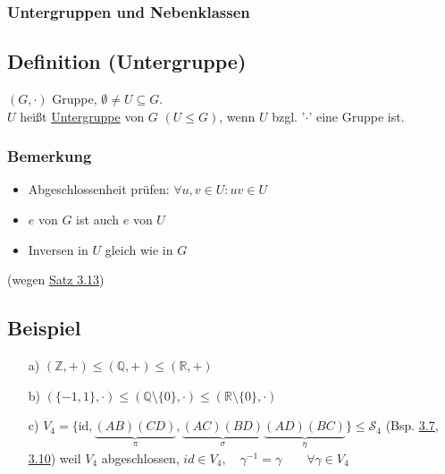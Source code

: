 \documentclass[12pt,titlepage, pdf]{article}
\newcommand{\R}{\mathds{R}}
\newcommand{\uline}[1]{\underline{#1}}
\newcommand{\id}{\textrm{id}}
\renewcommand{\>}{\rightarrow}
\renewcommand{\*}{\cdot}
\begin{document}
	\subsubsection*{Untergruppen und Nebenklassen}
	\subsection{Definition (Untergruppe)}
	$(G, \cdot)$ Gruppe, $\emptyset \neq U \subseteq G$.\\
	$U$ heißt \uline{Untergruppe} von $G$ $(U \leq G)$, wenn $U$ bzgl. '$\cdot$' eine Gruppe ist.
	
	\subsubsection*{Bemerkung}
	\begin{itemize}
		\item Abgeschlossenheit prüfen: $\forall u,v  \in U: uv \in U$
		\item $e$ von $G$ ist auch $e$ von $U$
		\item Inversen in $U$ gleich wie in $G$
	\end{itemize}
	(wegen \hyperref[3.13]{Satz 3.13})
	\subsection{Beispiel}
	\label{3.16}
	\begin{itemize}
		\item[a)] $(\mathds{Z}, +) \leq (\mathds{Q}, + ) \leq (\R, + )$
		\item[b)] $(\{-1,1\}, \cdot) \leq (\mathds{Q}\setminus \{0\}, \cdot) \leq (\R \setminus\{0\}, \cdot)$
		\item[c)] $V_4 = \{\id,\underbrace{(AB)(CD)}_{\pi},\underbrace{(AC)(BD)}_{\sigma} \underbrace{(AD)(BC)}_{\eta}\} \leq \mathscr{S}_4$ (Bsp. \hyperref[3.7]{3.7}, \hyperref[3.10]{3.10}) weil $V_4$ abgeschlossen, $id \in V_4,\quad \gamma^{-1} = \gamma \qquad \forall \gamma \in V_4$
	\end{itemize}
\end{document}
